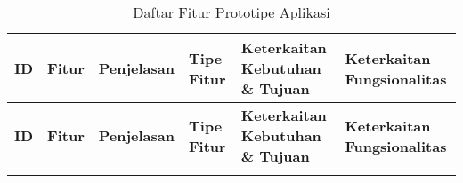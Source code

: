 \RaggedLeft
\begin{footnotesize}
  
\begin{longtable}[c]{|W{c}{0.05\textwidth}|>{\ccnormspacingcenter}m{0.14\textwidth}|>{\ccnormspacing}m{0.2\textwidth}|>{\ccnormspacingcenter}m{0.12\textwidth}|>{\ccnormspacingcenter}m{0.14\textwidth}|>{\ccnormspacingcenter}m{0.16\textwidth}|}
  \caption{Daftar Fitur Prototipe Aplikasi}
  \label{tab:daftar_fitur} \\
  \hline {}
  \textbf{ID} & \textbf{Fitur} & \centering\textbf{Penjelasan} & \textbf{Tipe Fitur} & \textbf{Keterkaitan Kebutuhan \& Tujuan} & \textbf{Keterkaitan Fungsionalitas} \\ \hline \endfirsthead
  \hline {}
  \textbf{ID} & \textbf{Fitur} & \centering\textbf{Penjelasan} & \textbf{Tipe Fitur} & \textbf{Keterkaitan Kebutuhan \& Tujuan} & \textbf{Keterkaitan Fungsionalitas} \\ \hline \endhead
  \hline \endfoot


\end{longtable}
\end{footnotesize}
